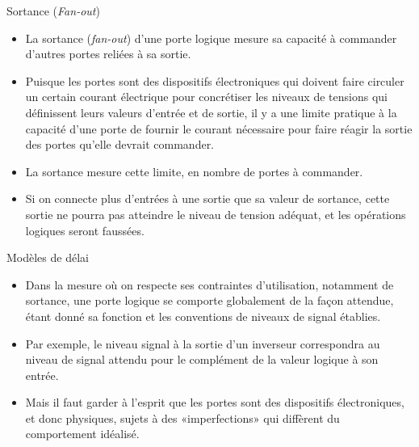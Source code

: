 \documentclass[presentation]{beamer}
\begin{document}
\begin{frame}[label={sec:orgb2fcacf}]{Sortance (\emph{Fan-out})}
\begin{itemize}
\item La sortance (\emph{fan-out}) d'une porte logique mesure sa capacité à commander d'autres portes reliées à sa sortie.

\item Puisque les portes sont des dispositifs électroniques qui doivent faire circuler un certain courant électrique pour concrétiser les niveaux de tensions qui définissent leurs valeurs d'entrée et de sortie, il y a une limite pratique à la capacité d'une porte de fournir le courant nécessaire pour faire réagir la sortie des portes qu'elle devrait commander.

\item La sortance mesure cette limite, en nombre de portes à commander.

\item Si on connecte plus d'entrées à une sortie que sa valeur de sortance, cette sortie ne pourra pas atteindre le niveau de tension adéquat, et les opérations logiques seront faussées.
\end{itemize}
\end{frame}

\begin{frame}[label={sec:orgc075112}]{Modèles de délai}
\begin{itemize}
\item Dans la mesure où on respecte ses contraintes d'utilisation, notamment de sortance, une porte logique se comporte globalement de la façon attendue, étant donné sa fonction et les conventions de niveaux de signal établies.

\item Par exemple, le niveau signal à la sortie d'un inverseur correspondra au niveau de signal attendu pour le complément de la valeur logique à son entrée.

\item Mais il faut garder à l'esprit que les portes sont des dispositifs électroniques, et donc physiques, sujets à des «imperfections» qui diffèrent du comportement idéalisé.
\end{itemize}
\end{frame}
\end{document}
